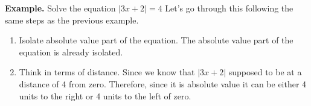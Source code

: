 \textbf{Example.} Solve the equation $|3x+2|=4$
Let's go through this following the same steps as the previous example.
\begin{enumerate}
	\item Isolate absolute value part of the equation.
	      The absolute value part of the equation is already isolated.
	\item Think in terms of distance.
	      Since we know that $|3x+2|$ supposed to be at a distance of 4 from zero. Therefore, since it is absolute value it can be either 4 units to the right or 4 units to the left of zero.
	      \\
\end{enumerate}
